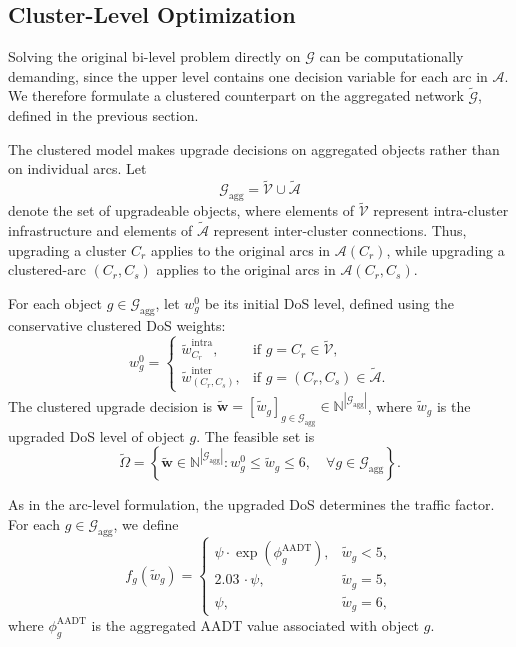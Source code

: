 \documentclass[lettersize,journal]{IEEEtran}
\begin{document}
\subsection{Cluster-Level Optimization}
\label{subsec:cluster_optimization}

Solving the original bi-level problem directly on $\mathcal{G}$ can be
computationally demanding, since the upper level contains one decision variable
for each arc in $\mathcal{A}$. We therefore formulate a clustered counterpart on
the aggregated network $\tilde{\mathcal{G}}$, defined in the previous section.

The clustered model makes upgrade decisions on aggregated objects rather than on
individual arcs. Let
\[
\mathcal{G}_{\mathrm{agg}}
=
\tilde{\mathcal{V}}
\cup
\tilde{\mathcal{A}}
\]
denote the set of upgradeable objects, where elements of $\tilde{\mathcal{V}}$
represent intra-cluster infrastructure and elements of $\tilde{\mathcal{A}}$
represent inter-cluster connections. Thus, upgrading a cluster $C_r$ applies to
the original arcs in $\mathcal{A}(C_r)$, while upgrading a clustered-arc
$(C_r,C_s)$ applies to the original arcs in $\mathcal{A}(C_r,C_s)$.

For each object $g\in\mathcal{G}_{\mathrm{agg}}$, let $w_g^0$ be its initial DoS
level, defined using the conservative clustered DoS weights:
\[
w_g^0
=
\begin{cases}
\tilde{w}^{\mathrm{intra}}_{C_r},
& \text{if } g=C_r\in\tilde{\mathcal{V}},\\[0.3em]
\tilde{w}^{\mathrm{inter}}_{(C_r,C_s)},
& \text{if } g=(C_r,C_s)\in\tilde{\mathcal{A}}.
\end{cases}
\]
The clustered upgrade decision is $\tilde{\mathbf{w}}
= \left [\tilde{w}_g\right ]_{g\in\mathcal{G}_{\mathrm{agg}}} \in \mathbb{N}^{|\mathcal{G}_{\mathrm{agg}}|}$, where $\tilde{w}_g$ is the upgraded DoS level of object $g$. The feasible set is
\begin{equation}
\label{eq:Omega_cluster_conf}
\tilde{\Omega}
=
\left\{
\tilde{\mathbf{w}}\in
\mathbb{N}^{|\mathcal{G}_{\mathrm{agg}}|}
:
w_g^0
\leq
\tilde{w}_g
\leq
6,
\quad
\forall g\in\mathcal{G}_{\mathrm{agg}}
\right\}.
\end{equation}

As in the arc-level formulation, the upgraded DoS determines the traffic factor.
For each $g\in\mathcal{G}_{\mathrm{agg}}$, we define
\begin{equation}
\label{eq:cluster_traffic_factor_conf}
f_g(\tilde{w}_g)
=
\begin{cases}
\psi \cdot \exp(\phi_g^{\mathrm{AADT}}), & \tilde{w}_g < 5,\\
2.03\, \cdot \psi, & \tilde{w}_g = 5,\\
\psi, & \tilde{w}_g = 6,
\end{cases}
\end{equation}
where $\phi_g^{\mathrm{AADT}}$ is the aggregated AADT value associated with object
$g$.
\end{document}
